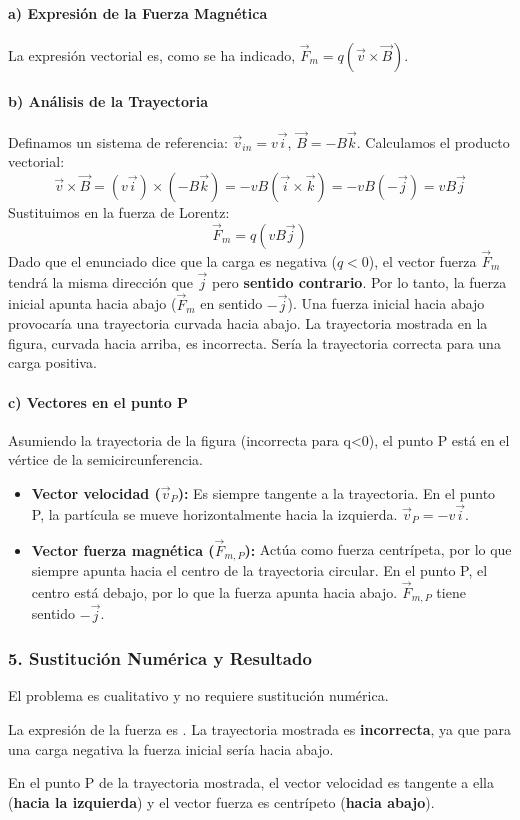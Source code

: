 \paragraph*{a) Expresión de la Fuerza Magnética}
La expresión vectorial es, como se ha indicado, $\vec{F}_m = q(\vec{v} \times \vec{B})$.

\paragraph*{b) Análisis de la Trayectoria}
Definamos un sistema de referencia: $\vec{v}_{in} = v\vec{i}$, $\vec{B} = -B\vec{k}$.
Calculamos el producto vectorial:
$$ \vec{v} \times \vec{B} = (v\vec{i}) \times (-B\vec{k}) = -vB (\vec{i} \times \vec{k}) = -vB(-\vec{j}) = vB\vec{j} $$
Sustituimos en la fuerza de Lorentz:
$$ \vec{F}_m = q(vB\vec{j}) $$
Dado que el enunciado dice que la carga es negativa ($q<0$), el vector fuerza $\vec{F}_m$ tendrá la misma dirección que $\vec{j}$ pero \textbf{sentido contrario}. Por lo tanto, la fuerza inicial apunta hacia abajo ($\vec{F}_m$ en sentido $-\vec{j}$).
Una fuerza inicial hacia abajo provocaría una trayectoria curvada hacia abajo. La trayectoria mostrada en la figura, curvada hacia arriba, es incorrecta. Sería la trayectoria correcta para una carga positiva.

\paragraph*{c) Vectores en el punto P}
Asumiendo la trayectoria de la figura (incorrecta para q<0), el punto P está en el vértice de la semicircunferencia.
\begin{itemize}
    \item \textbf{Vector velocidad ($\vec{v}_P$):} Es siempre tangente a la trayectoria. En el punto P, la partícula se mueve horizontalmente hacia la izquierda. $\vec{v}_P = -v\vec{i}$.
    \item \textbf{Vector fuerza magnética ($\vec{F}_{m,P}$):} Actúa como fuerza centrípeta, por lo que siempre apunta hacia el centro de la trayectoria circular. En el punto P, el centro está debajo, por lo que la fuerza apunta hacia abajo. $\vec{F}_{m,P}$ tiene sentido $-\vec{j}$.
\end{itemize}

\subsubsection*{5. Sustitución Numérica y Resultado}
El problema es cualitativo y no requiere sustitución numérica.
\begin{cajaresultado}
    La expresión de la fuerza es . La trayectoria mostrada es \textbf{incorrecta}, ya que para una carga negativa la fuerza inicial sería hacia abajo.
\end{cajaresultado}
\begin{cajaresultado}
    En el punto P de la trayectoria mostrada, el vector velocidad es tangente a ella (\textbf{hacia la izquierda}) y el vector fuerza es centrípeto (\textbf{hacia abajo}).
\end{cajaresultado}

